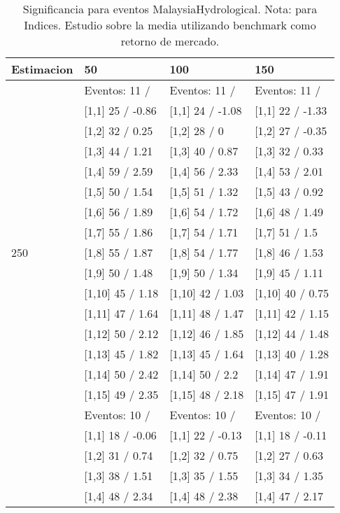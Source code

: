\begin{table}

\caption{Significancia para eventos MalaysiaHydrological. Nota: para Indices. Estudio sobre la media utilizando benchmark como retorno de mercado.}
\centering
\begin{tabular}[t]{llll}
\toprule
Estimacion & 50 & 100 & 150\\
\midrule
 & Eventos:  11 / & Eventos:  11 / & Eventos:  11 /\\
 & {}[1,1] 25  / -0.86 & {}[1,1] 24  / -1.08 & {}[1,1] 22  / -1.33\\
 & {}[1,2] 32  / 0.25 & {}[1,2] 28  / 0 & {}[1,2] 27  / -0.35\\
 & {}[1,3] 44  / 1.21 & {}[1,3] 40  / 0.87 & {}[1,3] 32  / 0.33\\
 & {}[1,4] 59  / 2.59 & {}[1,4] 56  / 2.33 & {}[1,4] 53  / 2.01\\
\addlinespace
 & {}[1,5] 50  / 1.54 & {}[1,5] 51  / 1.32 & {}[1,5] 43  / 0.92\\
 & {}[1,6] 56  / 1.89 & {}[1,6] 54  / 1.72 & {}[1,6] 48  / 1.49\\
 & {}[1,7] 55  / 1.86 & {}[1,7] 54  / 1.71 & {}[1,7] 51  / 1.5\\
250 & {}[1,8] 55  / 1.87 & {}[1,8] 54  / 1.77 & {}[1,8] 46  / 1.53\\
 & {}[1,9] 50  / 1.48 & {}[1,9] 50  / 1.34 & {}[1,9] 45  / 1.11\\
\addlinespace
 & {}[1,10] 45  / 1.18 & {}[1,10] 42  / 1.03 & {}[1,10] 40  / 0.75\\
 & {}[1,11] 47  / 1.64 & {}[1,11] 48  / 1.47 & {}[1,11] 42  / 1.15\\
 & {}[1,12] 50  / 2.12 & {}[1,12] 46  / 1.85 & {}[1,12] 44  / 1.48\\
 & {}[1,13] 45  / 1.82 & {}[1,13] 45  / 1.64 & {}[1,13] 40  / 1.28\\
 & {}[1,14] 50  / 2.42 & {}[1,14] 50  / 2.2 & {}[1,14] 47  / 1.91\\
\addlinespace
 & {}[1,15] 49  / 2.35 & {}[1,15] 48  / 2.18 & {}[1,15] 47  / 1.91\\
 & Eventos:  10 / & Eventos:  10 / & Eventos:  10 /\\
 & {}[1,1] 18  / -0.06 & {}[1,1] 22  / -0.13 & {}[1,1] 18  / -0.11\\
 & {}[1,2] 31  / 0.74 & {}[1,2] 32  / 0.75 & {}[1,2] 27  / 0.63\\
 & {}[1,3] 38  / 1.51 & {}[1,3] 35  / 1.55 & {}[1,3] 34  / 1.35\\
\addlinespace
 & {}[1,4] 48  / 2.34 & {}[1,4] 48  / 2.38 & {}[1,4] 47  / 2.17\\

\end{tabular}
\end{table}
